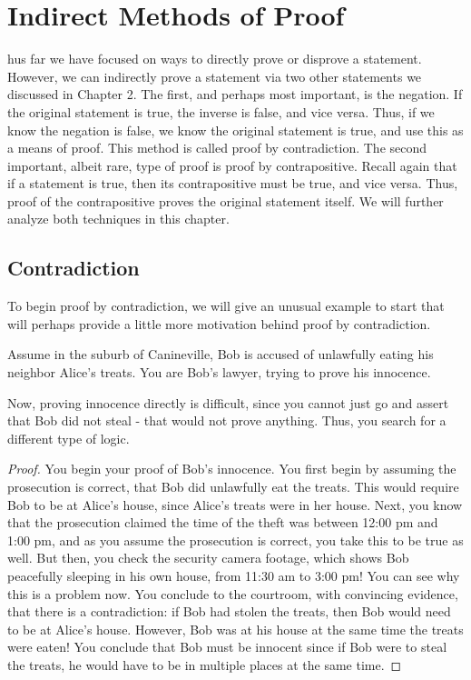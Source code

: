 \chapter{Indirect Methods of Proof}

hus far we have focused on ways to directly prove or disprove a statement. However, we can indirectly prove a statement via two other statements we discussed in Chapter 2. The first, and perhaps most important, is the negation. If the original statement is true, the inverse is false, and vice versa. Thus, if we know the negation is false, we know the original statement is true, and use this as a means of proof. This method is called proof by contradiction. The second important, albeit rare, type of proof is proof by contrapositive. Recall again that if a statement is true, then its contrapositive must be true, and vice versa. Thus, proof of the contrapositive proves the original statement itself. We will further analyze both techniques in this chapter.

\section{Contradiction}
To begin proof by contradiction, we will give an unusual example to start that will perhaps provide a little more motivation behind proof by contradiction. 

\begin{example}
Assume in the suburb of Canineville, Bob is accused of unlawfully eating his neighbor Alice's treats. You are Bob's lawyer, trying to prove his innocence. 
\end{example}
Now, proving innocence directly is difficult, since you cannot just go and assert that Bob did not steal - that would not prove anything. Thus, you search for a different type of logic.  
\begin{proof}
You begin your proof of Bob's innocence. You first begin by assuming the prosecution is correct, that Bob did unlawfully eat the treats. This would require Bob to be at Alice's house, since Alice's treats were in her house. Next, you know that the prosecution claimed the time of the theft was between 12:00 pm and 1:00 pm, and as you assume the prosecution is correct, you take this to be true as well. But then, you check the security camera footage, which shows Bob peacefully sleeping in his own house, from 11:30 am to 3:00 pm! You can see why this is a problem now. You conclude to the courtroom, with convincing evidence, that there is a contradiction: if Bob had stolen the treats, then Bob would need to be at Alice's house. However, Bob was at his house at the same time the treats were eaten! You conclude that Bob must be innocent since if Bob were to steal the treats, he would have to be in multiple places at the same time.
\end{proof}

